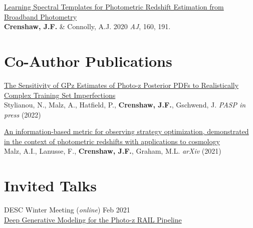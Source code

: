 \documentclass[margin]{res}
\newcommand{\paper}[2]{\href{#1}{\sc #2}}
\begin{document}
\begin{resume}
\begin{etaremune}[leftmargin=0pt]

\item \paper{https://ui.adsabs.harvard.edu/abs/2020AJ....160..191C/abstract}{Learning Spectral Templates for Photometric Redshift Estimation from Broadband Photometry} \\
\textbf{Crenshaw, J.F.} \& Connolly, A.J. 2020 \textit{AJ}, 160, 191.

\end{etaremune}

\section{Co-Author Publications}

\begin{etaremune}[leftmargin=0pt]

\item \paper{https://ui.adsabs.harvard.edu/abs/2022arXiv220212775S/abstract}{The Sensitivity of GPz Estimates of Photo-z Posterior PDFs to Realistically Complex Training Set Imperfections} \\
Stylianou, N., Malz, A., Hatfield, P., \textbf{Crenshaw, J.F.}, Gschwend, J. \textit{PASP in press} (2022)

\item \paper{https://arxiv.org/abs/2104.08229}{An information-based metric for observing strategy optimization, demonstrated in the context of photometric redshifts with applications to cosmology} \\
Malz, A.I., Lanusse, F., \textbf{Crenshaw, J.F.}, Graham, M.L. \textit{arXiv} (2021)

\end{etaremune}

\section{Invited Talks}

\hangindent=2mm
DESC Winter Meeting (\textit{online}) \hfill Feb 2021 \\ \href{https://docs.google.com/presentation/d/179O1gnQpVfbIwZLfi7TlW8gYhP3K4MFBbi_8lAighNs/edit?usp=sharing}{Deep Generative Modeling for the Photo-z RAIL Pipeline}


\end{resume}
\end{document}
